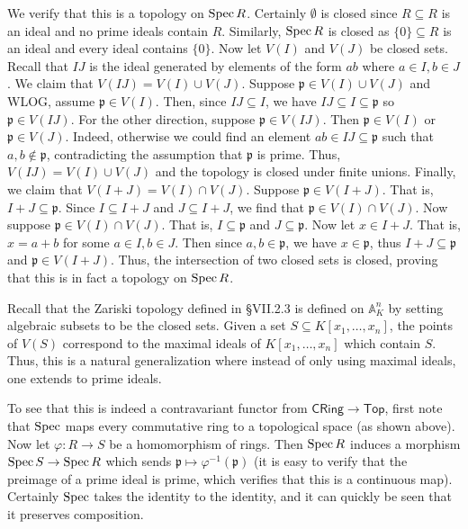 \documentclass[../../master.tex]{subfiles}
\begin{document}
\begin{solution}
    We verify that this is a topology on $\operatorname{Spec} R$.
    Certainly $\emptyset$ is closed since $R \subseteq R$ is an ideal and no prime ideals contain $R$.
    Similarly, $\operatorname{Spec} R$ is closed as $\{0\} \subseteq R$ is an ideal and every ideal contains $\{0\}$.
    Now let $V(I)$ and $V(J)$ be closed sets.
    Recall that $IJ$ is the ideal generated by elements of the form $ab$ where $a \in I, b \in J$.
    We claim that $V(IJ) = V(I) \cup V(J)$.
    Suppose $\mathfrak{p} \in V(I) \cup V(J)$ and WLOG, assume $\mathfrak{p} \in V(I)$.
    Then, since $IJ \subseteq I$, we have $IJ \subseteq I \subseteq \mathfrak{p}$ so $\mathfrak{p} \in V(IJ)$.
    For the other direction, suppose $\mathfrak{p} \in V(IJ)$.
    Then $\mathfrak{p} \in V(I)$ or $\mathfrak{p} \in V(J)$.
    Indeed, otherwise we could find an element $ab \in IJ \subseteq \mathfrak{p}$ such that $a, b \notin \mathfrak{p}$, contradicting the assumption that $\mathfrak{p}$ is prime.
    Thus, $V(IJ) = V(I) \cup V(J)$ and the topology is closed under finite unions.
    Finally, we claim that $V(I + J) = V(I) \cap V(J)$.
    Suppose $\mathfrak{p} \in V(I+J)$.
    That is, $I + J \subseteq \mathfrak{p}$.
    Since $I \subseteq I + J$ and $J \subseteq I + J$, we find that $\mathfrak{p} \in V(I) \cap V(J)$.
    Now suppose $\mathfrak{p} \in V(I) \cap V(J)$.
    That is, $I \subseteq \mathfrak{p}$ and $J \subseteq \mathfrak{p}$.
    Now let $x \in I + J$.
    That is, $x = a + b$ for some $a \in I, b \in J$.
    Then since $a,b \in \mathfrak{p}$, we have $x \in \mathfrak{p}$, thus $I + J \subseteq \mathfrak{p}$ and  $\mathfrak{p} \in V(I + J)$.
    Thus, the intersection of two closed sets is closed, proving that this is in fact a topology on $\operatorname{Spec} R$.

    Recall that the Zariski topology defined in \S VII.2.3 is defined on $\mathbb{A}^{n}_K$ by setting algebraic subsets to be the closed sets.
    Given a set $S \subseteq K[x_1, \ldots, x_n]$, the points of $V(S)$ correspond to the maximal ideals of $K[x_1, \ldots, x_n]$ which contain $S$.
    Thus, this is a natural generalization where instead of only using maximal ideals, one extends to prime ideals.

    To see that this is indeed a contravariant functor from $\mathsf{CRing} \to \mathsf{Top}$, first note that $\operatorname{Spec}$ maps every commutative ring to a topological space (as shown above).
    Now let $\varphi: R \to S$ be a homomorphism of rings.
    Then $\operatorname{Spec} R$ induces a morphism $\operatorname{Spec} S \to \operatorname{Spec} R$ which sends $\mathfrak{p} \mapsto \varphi^{-1}(\mathfrak{p})$ (it is easy to verify that the preimage of a prime ideal is prime, which verifies that this is a continuous map).
    Certainly $\operatorname{Spec}$ takes the identity to the identity, and it can quickly be seen that it preserves composition.
\end{solution}
\end{document}
